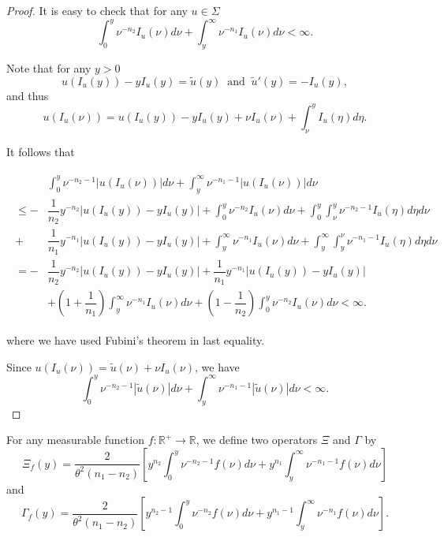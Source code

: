 \documentclass[a4paper,report, 11pt]{article}
\def\t{\theta}
\begin{document}
\begin{proof}
	
	It is easy to check that for any $u\in \Sigma$ 
	\begin{equation*}
	\int_0^y \nu^{-n_2}I_{u}(\nu)d\nu +\int_y^\infty \nu^{-n_1}I_u(\nu)d\nu <\infty. 
	\end{equation*}
	
	
	Note that for any $y>0$ 
\begin{equation*}
u(I_u(y))-yI_u(y)=\tilde{u}(y)\;\;\mbox{and}\;\;\tilde{u}'(y)=-I_u(y),
\end{equation*}
and thus
\begin{equation*}
u(I_u(\nu))=u(I_u(y))-yI_u(y)+\nu I_u(\nu)+\int_{\nu}^y I_u(\eta)d\eta. 
\end{equation*}


	It follows that 
	\begin{footnotesize}
		\begin{eqnarray}
		\begin{split}\label{eq:u-integral}
		&\int_0^y \nu^{-n_2-1}|u(I_{u}(\nu))|d\nu +\int_y^\infty \nu^{-n_1-1}|u(I_{u}(\nu))|d\nu\\
		\le-&\dfrac{1}{n_2}y^{-n_2}|u(I_{u}(y))-yI_{u}(y)|+\int_0^y \nu^{-n_2}I_{u}(\nu)d\nu +\int_0^y \int_\nu^y \nu^{-n_2-1}I_{u}(\eta)d\eta d\nu\\ +&\dfrac{1}{n_1}y^{-n_1}|u(I_{u}(y))-yI_{u}(y)|+\int_y^\infty \nu^{-n_1}I_{u}(\nu)d\nu +\int_y^\infty \int_y^\nu \nu^{-n_1-1}I_{u}(\eta)d\eta d\nu\\
		=-&\dfrac{1}{n_2}y^{-n_2}|u(I_{u}(y))-yI_{u}(y)|+\dfrac{1}{n_1}y^{-n_1}|u(I_{u}(y))-yI_{u}(y)|\\&+\left(1+\dfrac{1}{n_1}\right)\int_y^\infty \nu^{-n_1}I_{u}(\nu)d\nu +\left(1-\dfrac{1}{n_2}\right)\int_0^y \nu^{-n_2}I_{u}(\nu)d\nu <\infty. 
		\end{split}
		\end{eqnarray}
	\end{footnotesize}
	where we have used Fubini's theorem in last equality.
	
	Since $u(I_u(\nu))=\tilde{u}(\nu)+\nu I_{u}(\nu)$, we have 
	\begin{equation}\label{eq:utilde-integral}
	\int_0^y \nu^{-n_2-1}|\tilde{u}(\nu)|d\nu +\int_y^\infty \nu^{-n_1-1}|\tilde{u}(\nu)|d\nu<\infty.
	\end{equation}
\end{proof}

For any measurable function $f:\mathbb{R}^+\to \mathbb{R}$, we define two operators $\Xi$ and $\Gamma$ by 
\begin{equation*}
\Xi_f(y)=\dfrac{2}{\t^2(n_1-n_2)}\left[y^{n_2}\int_0^y \nu^{-n_2-1}f(\nu)d\nu +y^{n_1}\int_y^\infty \nu^{-n_1-1}f(\nu)d\nu\right]
\end{equation*}
and
\begin{equation*}
\Gamma_f(y)=\dfrac{2}{\t^2(n_1-n_2)}\left[y^{n_2-1}\int_0^y \nu^{-n_2}f(\nu)d\nu +y^{n_1-1}\int_y^\infty \nu^{-n_1}f(\nu)d\nu\right].
\end{equation*}
\end{document}
